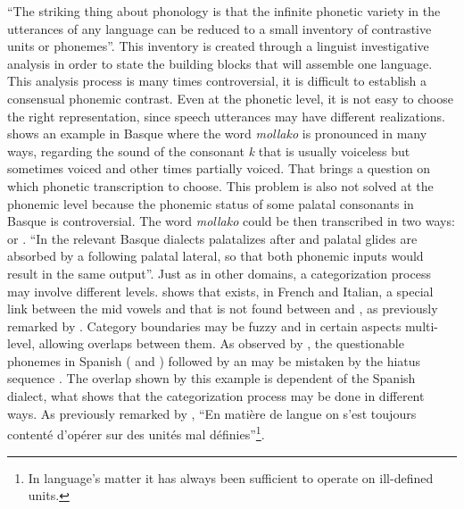 ``The striking thing about phonology is that the infinite phonetic variety in the utterances of any language can be reduced to a small inventory of contrastive units or phonemes''\citep{hualde2004}. This inventory is created through a linguist investigative analysis in order to state the building blocks that will assemble one language. This analysis process is many times controversial, it is difficult to establish a consensual phonemic contrast. Even at the phonetic level, it is not easy to choose the right representation, since speech utterances may have different realizations. \cite{hualde2004} shows an example in Basque where the word \textit{mollako} is pronounced in many ways, regarding the sound of the consonant \textit{k} that is usually voiceless but sometimes voiced and other times partially voiced. That brings a question on which phonetic transcription to choose. This problem is also not solved at the phonemic level because the phonemic status of some palatal consonants in Basque is controversial. The word \textit{mollako} could be then transcribed in two ways:  or . ``In the relevant Basque dialects  palatalizes after  and palatal glides are absorbed by a following palatal lateral, so that both phonemic inputs would result in the same output''\citep{hualde2004}. Just as in other domains, a categorization process may involve different levels. \cite{ladd} shows that exists, in French and Italian, a special link between the mid vowels  and  that is not found between  and , as previously remarked by \cite{trubetzkoy}. Category boundaries may be fuzzy and in certain aspects multi-level, allowing overlaps between them. As observed by \cite{hualde2004}, the questionable phonemes in Spanish ( and ) followed by an \textipa{[a]} may be mistaken by the hiatus sequence . The overlap shown by this example is dependent of the Spanish dialect, what shows that the categorization process may be done in different ways. As previously remarked by \cite{saussure}, ``En matière de langue on s’est toujours contenté d’opérer sur des unités mal définies''\footnote{In language's matter it has always been sufficient to operate on ill-defined units.}.

